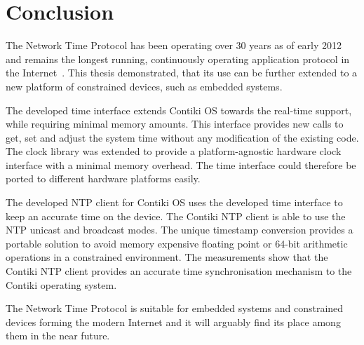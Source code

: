 






\chapter{Conclusion}
The Network Time Protocol has been operating over 30 years as of early 2012
and remains the longest running, continuously operating application
protocol in the Internet~\cite{ntp-y2k}.
This thesis demonstrated, that its use can be further extended to a new platform of constrained devices,
such as embedded systems.

The developed time interface extends Contiki OS towards the real-time support,
while requiring minimal memory amounts.
This interface provides new calls to get, set and adjust the system time without any modification
of the existing code.
The clock library was extended to provide a platform-agnostic hardware clock interface
with a minimal memory overhead.
The time interface could therefore be ported to different hardware platforms easily.

The developed NTP client for Contiki OS uses the developed time interface to keep an accurate time on the device.
The Contiki NTP client is able to use the NTP unicast and broadcast modes.
The unique timestamp conversion provides a portable solution to avoid
memory expensive floating point or 64-bit arithmetic operations in a constrained environment.
The measurements show that the Contiki NTP client provides an accurate time
synchronisation mechanism to the Contiki operating system.

The Network Time Protocol is suitable for embedded systems and constrained devices
forming the modern Internet and it will arguably find its place among them in the near future.







